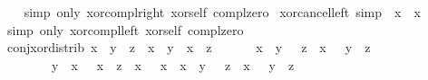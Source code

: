 \begin{isabellebody}
%
\isadelimproof
\ \ %
\endisadelimproof
%
\isatagproof
{}\isamarkupfalse%
\ {\isacharparenleft}{\kern0pt}simp\ only{\isacharcolon}{\kern0pt}\ xor{\isacharunderscore}{\kern0pt}compl{\isacharunderscore}{\kern0pt}right\ xor{\isacharunderscore}{\kern0pt}self\ compl{\isacharunderscore}{\kern0pt}zero{\isacharparenright}{\kern0pt}%
\endisatagproof
{\isafoldproof}%
%
\isadelimproof
\isanewline
%
\endisadelimproof
\isanewline
{}\isamarkupfalse%
\ xor{\isacharunderscore}{\kern0pt}cancel{\isacharunderscore}{\kern0pt}left\ {\isacharbrackleft}{\kern0pt}simp{\isacharbrackright}{\kern0pt}{\isacharcolon}{\kern0pt}\ {\isachardoublequoteopen}\isactrlbold {\isacharminus}{\kern0pt}\ x\ \isactrlbold {\isasymominus}\ x\ {\isacharequal}{\kern0pt}\ \isanewline
%
\isadelimproof
\ \ %
\endisadelimproof
%
\isatagproof
{}\isamarkupfalse%
\ {\isacharparenleft}{\kern0pt}simp\ only{\isacharcolon}{\kern0pt}\ xor{\isacharunderscore}{\kern0pt}compl{\isacharunderscore}{\kern0pt}left\ xor{\isacharunderscore}{\kern0pt}self\ compl{\isacharunderscore}{\kern0pt}zero{\isacharparenright}{\kern0pt}%
\endisatagproof
{\isafoldproof}%
%
\isadelimproof
\isanewline
%
\endisadelimproof
\isanewline
{}\isamarkupfalse%
\ conj{\isacharunderscore}{\kern0pt}xor{\isacharunderscore}{\kern0pt}distrib{\isacharcolon}{\kern0pt}\ {\isachardoublequoteopen}x\ \isactrlbold {\isasymsqinter}\ {\isacharparenleft}{\kern0pt}y\ \isactrlbold {\isasymominus}\ z{\isacharparenright}{\kern0pt}\ {\isacharequal}{\kern0pt}\ {\isacharparenleft}{\kern0pt}x\ \isactrlbold {\isasymsqinter}\ y{\isacharparenright}{\kern0pt}\ \isactrlbold {\isasymominus}\ {\isacharparenleft}{\kern0pt}x\ \isactrlbold {\isasymsqinter}\ z{\isacharparenright}{\kern0pt}{\isachardoublequoteclose}\isanewline
%
\isadelimproof
%
\endisadelimproof
%
\isatagproof
{}\isamarkupfalse%
\ {\isacharminus}{\kern0pt}\isanewline
\ \ \isamarkupfalse%
\ {\isacharasterisk}{\kern0pt}{\isacharcolon}{\kern0pt}\ {\isachardoublequoteopen}{\isacharparenleft}{\kern0pt}x\ \isactrlbold {\isasymsqinter}\ y\ \isactrlbold {\isasymsqinter}\ \isactrlbold {\isacharminus}{\kern0pt}\ z{\isacharparenright}{\kern0pt}\ \isactrlbold {\isasymsqunion}\ {\isacharparenleft}{\kern0pt}x\ \isactrlbold {\isasymsqinter}\ \isactrlbold {\isacharminus}{\kern0pt}\ y\ \isactrlbold {\isasymsqinter}\ z{\isacharparenright}{\kern0pt}\ {\isacharequal}{\kern0pt}\isanewline
\ \ \ \ \ \ \ \ {\isacharparenleft}{\kern0pt}y\ \isactrlbold {\isasymsqinter}\ x\ \isactrlbold {\isasymsqinter}\ \isactrlbold {\isacharminus}{\kern0pt}\ x{\isacharparenright}{\kern0pt}\ \isactrlbold {\isasymsqunion}\ {\isacharparenleft}{\kern0pt}z\ \isactrlbold {\isasymsqinter}\ x\ \isactrlbold {\isasymsqinter}\ \isactrlbold {\isacharminus}{\kern0pt}\ x{\isacharparenright}{\kern0pt}\ \isactrlbold {\isasymsqunion}\ {\isacharparenleft}{\kern0pt}x\ \isactrlbold {\isasymsqinter}\ y\ \isactrlbold {\isasymsqinter}\ \isactrlbold {\isacharminus}{\kern0pt}\ z{\isacharparenright}{\kern0pt}\ \isactrlbold {\isasymsqunion}\ {\isacharparenleft}{\kern0pt}x\ \isactrlbold {\isasymsqinter}\ \isactrlbold {\isacharminus}{\kern0pt}\ y\ \isactrlbold {\isasymsqinter}\ z{\isacharparenright}{\kern0pt}{\isachardoublequoteclose}\isanewline

\end{isabellebody}
